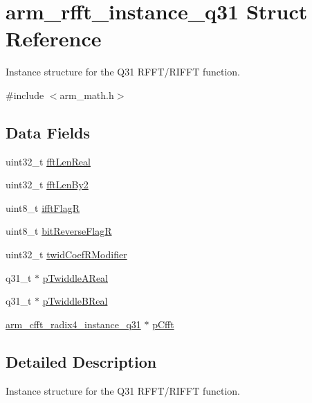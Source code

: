 \hypertarget{structarm__rfft__instance__q31}{\section{arm\-\_\-rfft\-\_\-instance\-\_\-q31 Struct Reference}
\label{structarm__rfft__instance__q31}
}


Instance structure for the Q31 R\-F\-F\-T/\-R\-I\-F\-F\-T function.  




{\ttfamily \#include $<$arm\-\_\-math.\-h$>$}

\subsection*{Data Fields}
\begin{DoxyCompactItemize}
\item 
uint32\-\_\-t \hyperlink{structarm__rfft__instance__q31_adf0d4604cf5546075d9d4cf122d6c986}{fft\-Len\-Real}
\item 
uint32\-\_\-t \hyperlink{structarm__rfft__instance__q31_ae7db13e0e2999656d98c4223de5b1284}{fft\-Len\-By2}
\item 
uint8\-\_\-t \hyperlink{structarm__rfft__instance__q31_a787d72055c89e4d62b188d6bd646341c}{ifft\-Flag\-R}
\item 
uint8\-\_\-t \hyperlink{structarm__rfft__instance__q31_ad56ec2425e2422108b8767b43d944591}{bit\-Reverse\-Flag\-R}
\item 
uint32\-\_\-t \hyperlink{structarm__rfft__instance__q31_a5b06f7f76c018db993fe6acc5708c589}{twid\-Coef\-R\-Modifier}
\item 
q31\-\_\-t $\ast$ \hyperlink{structarm__rfft__instance__q31_a059faa282f9186687d843ead4a7a0d7e}{p\-Twiddle\-A\-Real}
\item 
q31\-\_\-t $\ast$ \hyperlink{structarm__rfft__instance__q31_a611c385424ce77519f599980f96d5846}{p\-Twiddle\-B\-Real}
\item 
\hyperlink{structarm__cfft__radix4__instance__q31}{arm\-\_\-cfft\-\_\-radix4\-\_\-instance\-\_\-q31} $\ast$ \hyperlink{structarm__rfft__instance__q31_a0b1f4a05c1824bab3b9bd837a260232a}{p\-Cfft}
\end{DoxyCompactItemize}


\subsection{Detailed Description}
Instance structure for the Q31 R\-F\-F\-T/\-R\-I\-F\-F\-T function. 

